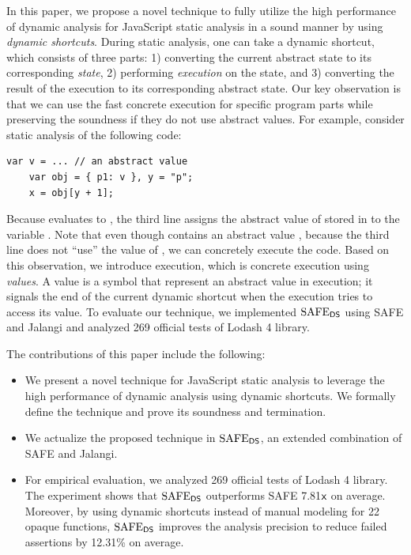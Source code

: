 In this paper, we propose a novel technique to fully utilize
the high performance of dynamic analysis for JavaScript static
analysis in a sound manner by using \textit{dynamic shortcuts}.
During static analysis, one can take a dynamic shortcut, which
consists of three parts: 1) converting the current abstract state to
its corresponding \textit{{\sealed} state}, 2) performing
\textit{{\sealed} execution} on the {\sealed} state, and
3) converting the result of the {\sealed} execution to its
corresponding abstract state.  Our key observation is that we can use
the fast concrete execution for specific program parts while
preserving the soundness if they do not use abstract values.
For example, consider static analysis of the following code:
\begin{lstlisting}[style=myJSstyle,numbers=none]
    var v = ... // an abstract value
    var obj = { p1: v }, y = "p";
    x = obj[y + 1];
\end{lstlisting}
Because  evaluates to ,
the third line assigns the abstract value of  stored in
 to the variable .
Note that even though  contains an abstract value ,
because the third line does not ``use'' the value of ,
we can concretely execute the code.  Based on this observation,
we introduce {\sealed} execution, which is concrete execution
using \textit{{\sealed} values}.  A {\sealed} value is a symbol
that represent an abstract value in {\sealed} execution; it signals
the end of the current dynamic shortcut when the {\sealed}
execution tries to access its value.
To evaluate our technique, we implemented $\text{SAFE}_{\textsf{DS}}$ using SAFE
and Jalangi and analyzed 269 official tests of Lodash 4 library.

The contributions of this paper include the following:
\begin{itemize}
\item We present a novel technique for JavaScript static
analysis to leverage the high performance of dynamic analysis using
dynamic shortcuts.  We formally define the technique and prove
its soundness and termination.
\item We actualize the proposed technique in $\text{SAFE}_{\textsf{DS}}$, an
extended combination of SAFE and Jalangi.
\item For empirical evaluation, we analyzed 269 official tests of
Lodash 4 library.  The experiment shows that $\text{SAFE}_{\textsf{DS}}$ outperforms
SAFE 7.81${\textsf{x}}$ on average.  Moreover, by using dynamic shortcuts
instead of manual modeling for 22 opaque functions,
$\text{SAFE}_{\textsf{DS}}$ improves the analysis precision to reduce failed assertions by 12.31\% on
average.
\end{itemize}

